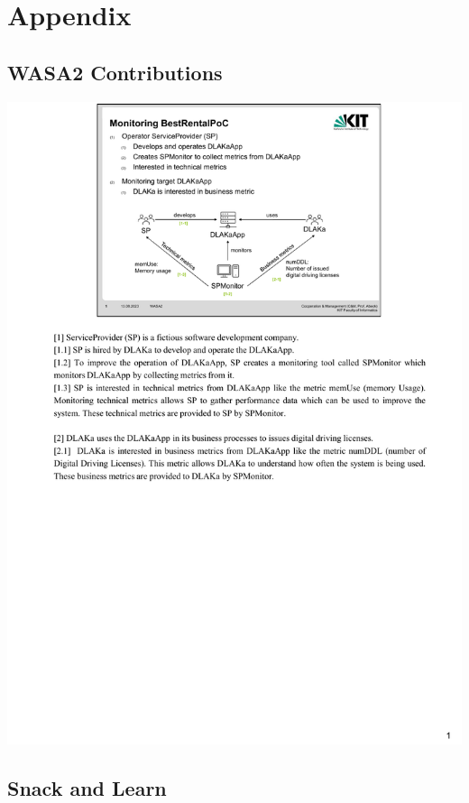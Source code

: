 \chapter{Appendix}
\label{cha:appendix}

\section{WASA2 Contributions}

\includegraphics[height=\textheight]{pdfs/engbrocks_wasa2_monitoring.pdf}


\section{Snack and Learn}

